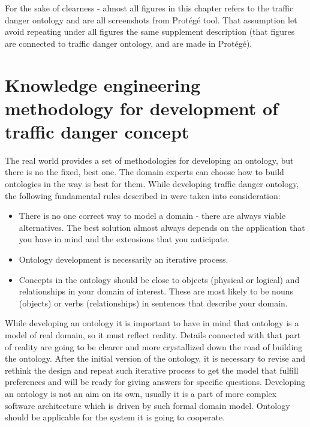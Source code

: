 \newpage

\begin{framed}
\noindent For the sake of clearness - almost all figures in this chapter refers to the traffic danger ontology and are all screenshots from Protégé tool. That assumption let avoid repeating under all figures the same supplement description (that figures are connected to traffic danger ontology, and are made in Protégé).
\end{framed}

\section{Knowledge engineering methodology for development of traffic danger concept}
\label{sec:knowledgeEngineering}

The real world provides a set of methodologies for developing an ontology, but there is no the fixed, best one. The domain experts can choose how to build ontologies in the way is best for them. While developing traffic danger ontology, the following fundamental rules described in \cite{OntDev101} were taken into consideration:
\begin{itemize}
    \item There is no one correct way to model a domain - there are always viable alternatives. The best solution almost always depends on the application that you have in mind and the extensions that you anticipate.
    \item Ontology development is necessarily an iterative process.
    \item Concepts in the ontology should be close to objects (physical or logical) and relationships in your domain of interest. These are most likely to be nouns (objects) or verbs (relationships) in sentences that describe your domain.
\end{itemize}

\noindent While developing an ontology it is important to have in mind that ontology is a model of real domain, so it must reflect reality. Details connected with that part of reality are going to be clearer and more crystallized down the road of building the ontology. After the initial version of the ontology, it is necessary to revise and rethink the design and repeat such iterative process to get the model that fulfill preferences and will be ready for giving answers for specific questions. Developing an ontology is not an aim on its own, usually it is a part of more complex software architecture which is driven by such formal domain model. Ontology should be applicable for the system it is going to cooperate. 

